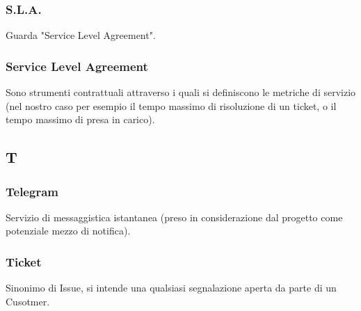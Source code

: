 \subsubsection{S.L.A.}
Guarda "Service Level Agreement".
\subsubsection{Service Level Agreement}
Sono strumenti contrattuali attraverso i quali si definiscono le metriche di servizio (nel nostro caso per esempio il tempo massimo di risoluzione di un ticket, o il tempo massimo di presa in carico).

\subsection{T}
\subsubsection{Telegram}
Servizio di messaggistica istantanea (preso in considerazione dal progetto come potenziale mezzo di notifica).
\subsubsection{Ticket}
Sinonimo di Issue, si intende una qualsiasi segnalazione aperta da parte di un Cusotmer.